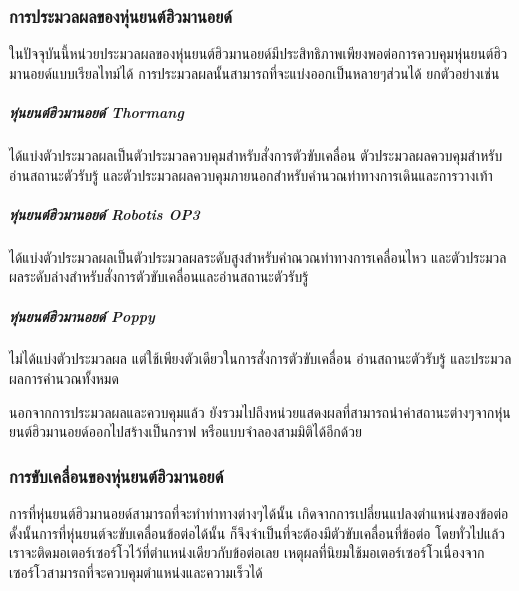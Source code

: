 \clearpage
\subsubsection*{การประมวลผลของหุ่นยนต์ฮิวมานอยด์}
ในปัจจุบันนี้หน่วยประมวลผลของหุ่นยนต์ฮิวมานอยด์มีประสิทธิภาพเพียงพอต่อการควบคุมหุ่นยนต์ฮิวมานอยด์แบบเรียลไทม์ได้
การประมวลผลนั้นสามารถที่จะแบ่งออกเป็นหลายๆส่วนได้ ยกตัวอย่างเช่น

\subparagraph*{หุ่นยนต์ฮิวมานอยด์ Thormang}
ได้แบ่งตัวประมวลผลเป็นตัวประมวลควบคุมสำหรับสั่งการตัวขับเคลื่อน ตัวประมวลผลควบคุมสำหรับอ่านสถานะตัวรับรู้ และตัวประมวลผลควบคุมภายนอกสำหรับคำนวณท่าทางการเดินและการวางเท้า
\subparagraph*{หุ่นยนต์ฮิวมานอยด์ Robotis OP3}
ได้แบ่งตัวประมวลผลเป็นตัวประมวลผลระดับสูงสำหรับคำณวณท่าทางการเคลื่อนไหว และตัวประมวลผลระดับล่างสำหรับสั่งการตัวขับเคลื่อนและอ่านสถานะตัวรับรู้
\subparagraph*{หุ่นยนต์ฮิวมานอยด์ Poppy}
ไม่ได้แบ่งตัวประมวลผล แต่ใช้เพียงตัวเดียวในการสั่งการตัวขับเคลื่อน อ่านสถานะตัวรับรู้ และประมวลผลการคำนวณทั้งหมด

นอกจากการประมวลผลและควบคุมแล้ว ยังรวมไปถึงหน่วยแสดงผลที่สามารถนำค่าสถานะต่างๆจากหุ่นยนต์ฮิวมานอยด์ออกไปสร้างเป็นกราฟ หรือแบบจำลองสามมิติได้อีกด้วย

\subsubsection*{การขับเคลื่อนของหุ่นยนต์ฮิวมานอยด์}
การที่หุ่นยนต์ฮิวมานอยด์สามารถที่จะทำท่าทางต่างๆได้นั้น เกิดจากการเปลี่ยนแปลงตำแหน่งของข้อต่อ ดั้งนั้นการที่หุ่นยนต์จะขับเคลื่อนข้อต่อได้นั้น
ก็จึงจำเป็นที่จะต้องมีตัวขับเคลื่อนที่ข้อต่อ โดยทั่วไปแล้วเราจะติดมอเตอร์เซอร์โวไว้ที่ตำแหน่งเดียวกับข้อต่อเลย เหตุผลที่นิยมใช้มอเตอร์เซอร์โวเนื่องจาก
เซอร์โวสามารถที่จะควบคุมตำแหน่งและความเร็วได้
